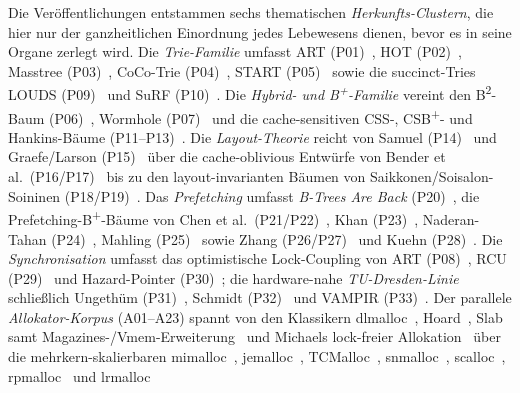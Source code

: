 \begin{nurlang}
Die Veröffentlichungen entstammen sechs thematischen \emph{Herkunfts-Clustern}, die hier nur der
ganzheitlichen Einordnung jedes Lebewesens dienen, bevor es in seine Organe zerlegt wird. Die
\emph{Trie-Familie} umfasst ART (P01)~\cite{leis2013art}, HOT (P02)~\cite{binna2018hot}, Masstree
(P03)~\cite{mao2012masstree}, CoCo-Trie (P04)~\cite{boffa2024coco}, START (P05)~\cite{fent2020start}
sowie die succinct-Tries LOUDS (P09)~\cite{jacobson1989louds} und SuRF (P10)~\cite{zhang2018surf}. Die
\emph{Hybrid- und B\textsuperscript{+}-Familie} vereint den B\textsuperscript{2}-Baum
(P06)~\cite{schmeisser2022b2tree}, Wormhole (P07)~\cite{wu2019wormhole} und die cache-sensitiven CSS-,
CSB\textsuperscript{+}- und Hankins-Bäume (P11--P13)~\cite{rao1999css,rao2000csb,hankins2003nodesize}.
Die \emph{Layout-Theorie} reicht von Samuel (P14)~\cite{samuel2005procaware} und Graefe/Larson
(P15)~\cite{graefe2001btree} über die cache-oblivious Entwürfe von Bender et
al.\ (P16/P17)~\cite{bender2000cobtree,bender2005coboblivious,bender2002treelayout,bender2002scanning,bender2002orderlist}
bis zu den layout-invarianten Bäumen von Saikkonen/Soisalon-Soininen
(P18/P19)~\cite{saikkonen2008multilevel,saikkonen2016layout}. Das \emph{Prefetching} umfasst \emph{B-Trees
Are Back} (P20)~\cite{mueller2025btreesback}, die Prefetching-B\textsuperscript{+}-Bäume von Chen et
al.\ (P21/P22)~\cite{chen2001prefetch,chen2002fractal}, Khan (P23)~\cite{khan2010adaptive}, Naderan-Tahan
(P24)~\cite{naderan2016adaptivefilter}, Mahling (P25)~\cite{mahling2025hotpath} sowie Zhang
(P26/P27)~\cite{zhang2024pathprefix,zhang2025hierarchical} und Kuehn (P28)~\cite{kuehn2023bplustree}. Die
\emph{Synchronisation} umfasst das optimistische Lock-Coupling von ART (P08)~\cite{leis2016olc}, RCU
(P29)~\cite{mckenney2001rcu} und Hazard-Pointer (P30)~\cite{michael2004hazard}; die hardware-nahe
\emph{TU-Dresden-Linie} schließlich Ungethüm (P31)~\cite{ungethuem2017survey}, Schmidt
(P32)~\cite{schmidt2025hbm} und VAMPIR (P33)~\cite{berthold2023vampir}. Der parallele
\emph{Allokator-Korpus} (A01--A23) spannt von den Klassikern dlmalloc~\cite{lea1996dlmalloc},
Hoard~\cite{berger2000hoard}, Slab samt Magazines-/Vmem-Erweiterung~\cite{bonwick1994slab,bonwick2001vmem}
und Michaels lock-freier
Allokation~\cite{michael2004lockfree} über die mehrkern-skalierbaren mimalloc~\cite{leijen2019mimalloc},
jemalloc~\cite{evans2006jemalloc}, TCMalloc~\cite{ghemawat2005tcmalloc}, snmalloc~\cite{lietar2019snmalloc},
scalloc~\cite{aigner2015scalloc}, rpmalloc~\cite{jansson2017rpmalloc} und lrmalloc~\cite{leite2018lrmalloc}

\end{nurlang}
